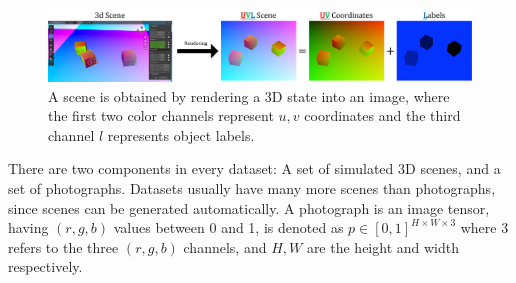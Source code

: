 \documentclass{article}
\begin{document}
	\begin{figure}[H]
	    \vspace{-5pt}
		\begin{center}
			\includegraphics[width=.8\textwidth]{../images/uvl_explanation_minimal.pdf}
		\end{center}
		\vspace{-10pt}
		\caption{
			A scene is obtained by rendering a 3D state into an image, where the first two color channels represent $u,v$ coordinates and the third channel $l$ represents object labels.
			}
		\label{fig:uvl_explanation}
		\vspace{-15pt}
	\end{figure}

	There are two components in every dataset: A set of simulated 3D scenes, and a set of photographs.
	Datasets usually have many more scenes than photographs, since scenes can be generated automatically.
	A photograph is an image tensor, having $(r,g,b)$ values between 0 and 1,
		is denoted as ${p \in [0,1]^{H \times W \times 3}}$ where 
		3 refers to the three $(r,g,b)$ channels, 
		and $H,W$ are the height and width respectively.
		
\end{document}
